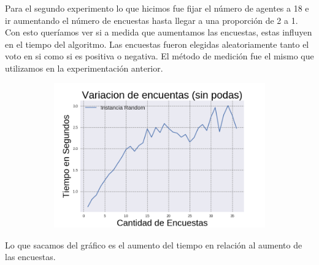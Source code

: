 	Para el segundo experimento lo que hicimos fue fijar el número de agentes a 18 e ir aumentando el número de encuestas hasta llegar a una proporción de 2 a 1. Con esto queríamos ver si a medida que aumentamos las encuestas, estas influyen en el tiempo del algoritmo. Las encuestas fueron elegidas aleatoriamente tanto el voto en si como si es positiva o negativa. El método de medición fue el mismo que utilizamos en la experimentación anterior.
	 
	\begin{figure}[h]
	\begin{subfigure}{0.5\textwidth}
	\includegraphics[scale=0.45]{VariacionesSinPodas.png}	
	\end{subfigure}
	\end{figure} 
	
	Lo que sacamos del gráfico es el aumento del tiempo en relación al aumento de las encuestas.
	\\	
	
